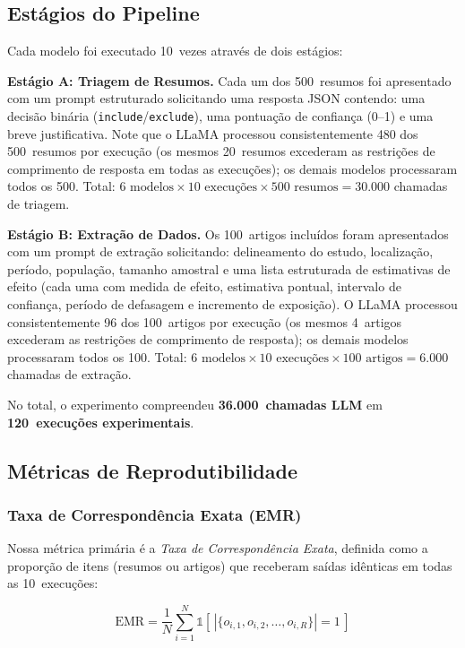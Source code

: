 \documentclass[12pt, a4paper]{article}
\newcommand{\emr}{\textrm{EMR}}
\begin{document}
\subsection{Estágios do Pipeline}

Cada modelo foi executado 10~vezes através de dois estágios:

\textbf{Estágio A: Triagem de Resumos.}
Cada um dos 500~resumos foi apresentado com um prompt estruturado solicitando uma resposta JSON contendo: uma decisão binária (\texttt{include}/\texttt{exclude}), uma pontuação de confiança (0--1) e uma breve justificativa.
Note que o LLaMA processou consistentemente 480 dos 500~resumos por execução (os mesmos 20~resumos excederam as restrições de comprimento de resposta em todas as execuções); os demais modelos processaram todos os 500.
Total: $6 \text{ modelos} \times 10 \text{ execuções} \times 500 \text{ resumos} = 30.000$ chamadas de triagem.

\textbf{Estágio B: Extração de Dados.}
Os 100~artigos incluídos foram apresentados com um prompt de extração solicitando: delineamento do estudo, localização, período, população, tamanho amostral e uma lista estruturada de estimativas de efeito (cada uma com medida de efeito, estimativa pontual, intervalo de confiança, período de defasagem e incremento de exposição).
O LLaMA processou consistentemente 96 dos 100~artigos por execução (os mesmos 4~artigos excederam as restrições de comprimento de resposta); os demais modelos processaram todos os 100.
Total: $6 \text{ modelos} \times 10 \text{ execuções} \times 100 \text{ artigos} = 6.000$ chamadas de extração.

No total, o experimento compreendeu \textbf{36.000~chamadas LLM} em \textbf{120~execuções experimentais}.

\subsection{Métricas de Reprodutibilidade}

\subsubsection{Taxa de Correspondência Exata (EMR)}

Nossa métrica primária é a \emph{Taxa de Correspondência Exata}, definida como a proporção de itens (resumos ou artigos) que receberam saídas idênticas em todas as 10~execuções:

\begin{equation}
  \emr = \frac{1}{N} \sum_{i=1}^{N} \mathbb{1}\!\left[\,\left|\{o_{i,1}, o_{i,2}, \ldots, o_{i,R}\}\right| = 1\,\right]
\end{equation}
\end{document}
